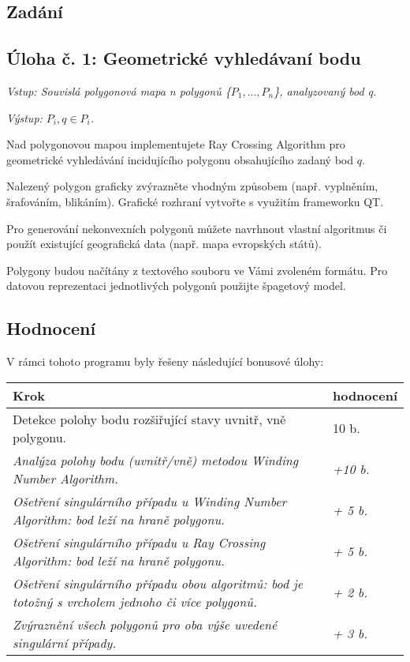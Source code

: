 \documentclass[15pt]{article}
\begin{document}
\begin{spacing}{1.5}

\section*{Zadání}
\subsection*{\textbf{Úloha č. 1: Geometrické vyhledávaní bodu}}
\noindent\textit{Vstup: Souvislá polygonová mapa n polygonů \{$P_1, ..., P_n$\}, analyzovaný bod q.}

\noindent\textit{Výstup: $P_i, q \in P_i$.}

\noindent Nad polygonovou mapou implementujete Ray Crossing Algorithm pro geometrické vyhledávání incidujícího polygonu obsahujícího zadaný bod $q$.

\noindent Nalezený polygon graficky zvýrazněte vhodným způsobem (např. vyplněním, šrafováním, blikáním). Grafické rozhraní vytvořte s využitím frameworku QT.

\noindent Pro generování nekonvexních polygonů můžete navrhnout vlastní algoritmus či použít existující geografická data (např. mapa evropských států).

\noindent Polygony budou načítány z textového souboru ve Vámi zvoleném formátu. Pro datovou reprezentaci jednotlivých polygonů použijte špagetový model.

\vspace{1cm}
\subsection*{\textbf{Hodnocení}}
V rámci tohoto programu byly řešeny následující bonusové úlohy:
\begin{center}
\begin{tabular}{|l|l|}
\hline
\textbf{Krok}                                                                                  & \textbf{hodnocení} \\ [0.5ex]  \hline\hline
Detekce polohy bodu rozšiřující stavy uvnitř, vně polygonu.                                    &  10 b.              \\ \hline
\textit{Analýza polohy bodu (uvnitř/vně) metodou Winding Number Algorithm.}                    & \textit{+10 b.}    \\ \hline
\textit{Ošetření singulárního případu u Winding Number Algorithm: bod leží na hraně polygonu.} & \textit{+ 5 b.}    \\ \hline
\textit{Ošetření singulárního případu u Ray Crossing Algorithm: bod leží na hraně polygonu.}   & \textit{+ 5 b.}    \\ \hline
\textit{Ošetření singulárního případu obou algoritmů: bod je totožný s vrcholem jednoho či více polygonů.} & \textit{+ 2 b.} \\ \hline
\textit{Zvýraznění všech polygonů pro oba výše uvedené singulární případy.}                    & \textit{+ 3 b.}    \\ \hline
\end{tabular}
\end{center}


\end{spacing}
\end{document}
